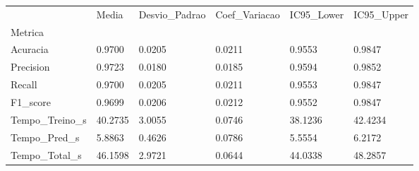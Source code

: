 \begin{tabular}{llllll}
\toprule
 & Media & Desvio_Padrao & Coef_Variacao & IC95_Lower & IC95_Upper \\
Metrica &  &  &  &  &  \\
\midrule
Acuracia & 0.9700 & 0.0205 & 0.0211 & 0.9553 & 0.9847 \\
Precision & 0.9723 & 0.0180 & 0.0185 & 0.9594 & 0.9852 \\
Recall & 0.9700 & 0.0205 & 0.0211 & 0.9553 & 0.9847 \\
F1_score & 0.9699 & 0.0206 & 0.0212 & 0.9552 & 0.9847 \\
Tempo_Treino_s & 40.2735 & 3.0055 & 0.0746 & 38.1236 & 42.4234 \\
Tempo_Pred_s & 5.8863 & 0.4626 & 0.0786 & 5.5554 & 6.2172 \\
Tempo_Total_s & 46.1598 & 2.9721 & 0.0644 & 44.0338 & 48.2857 \\
\bottomrule
\end{tabular}
